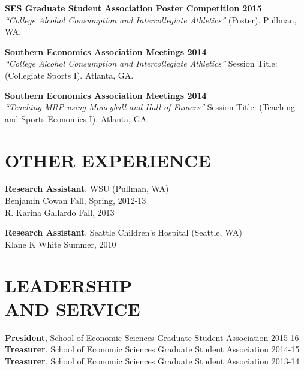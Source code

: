 \documentclass[margin]{res}  %
\begin{document}
\begin{resume}
\textbf{SES Graduate Student Association Poster Competition 2015}\\
\emph{``College Alcohol Consumption and Intercollegiate Athletics''} (Poster). Pullman, WA. %

\textbf{Southern Economics Association Meetings 2014}\\
\emph{``College Alcohol Consumption and Intercollegiate Athletics''}
Session Title: (Collegiate Sports I). Atlanta, GA. %

\textbf{Southern Economics Association Meetings 2014}\\
\emph{``Teaching MRP using Moneyball and Hall of Famers''}
Session Title: (Teaching and Sports Economics I). Atlanta, GA. %


\section{\textnormal{OTHER EXPERIENCE}}

\textbf{Research Assistant}, WSU (Pullman, WA) \\
Benjamin Cowan \hfill Fall, Spring, 2012-13\\
R. Karina Gallardo \hfill Fall, 2013

\textbf{Research Assistant}, Seattle Children's Hospital (Seattle, WA) \\
Klane K White \hfill Summer, 2010



\section{\textnormal{LEADERSHIP\\ AND SERVICE}} 
  
\textbf{President}, School of Economic Sciences Graduate Student Association \hfill 2015-16\\
\textbf{Treasurer}, School of Economic Sciences Graduate Student Association \hfill 2014-15\\
\textbf{Treasurer}, School of Economic Sciences Graduate Student Association \hfill 2013-14\\


\end{resume}
\end{document}

